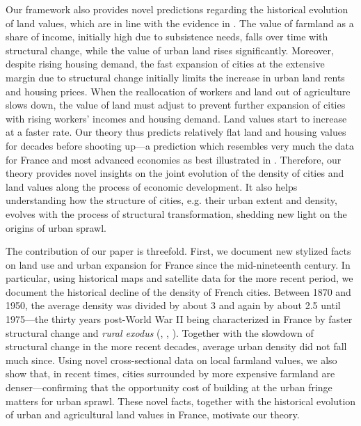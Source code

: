 \documentclass[./20250130-paper.tex]{subfiles}
\begin{document}
	Our framework also provides novel predictions regarding the historical evolution of land values, which are in line with the evidence in \cite{piketty2014capital}. The value of farmland as a share of income, initially high due to subsistence needs, falls over time with structural change, while the value of urban land rises significantly. Moreover, despite rising housing demand, the fast expansion of cities at the extensive margin due to structural change initially limits the increase in urban land rents and housing prices. When the reallocation of workers and land out of agriculture slows down, the value of land must adjust to prevent further expansion of cities with rising workers' incomes and housing demand. Land values start to increase at a faster rate. Our theory thus predicts relatively flat land and housing values for decades before shooting up---a prediction which resembles very much the data for France and most advanced economies as best illustrated in \cite{knoll2017no}. Therefore, our theory provides novel insights on the joint evolution of the density of cities and land values along the process of economic development. It also helps understanding how the structure of cities, e.g. their urban extent and density, evolves with the process of structural transformation, shedding new light on the origins of urban sprawl.%
	
	The contribution of our paper is threefold. First, we document new stylized facts on land use and urban expansion for France since the mid-nineteenth century. In particular, using historical maps and satellite data for the more recent period, we document the historical decline of the density of French cities. Between 1870 and 1950, the average density was divided by about 3 and again by about 2.5 until 1975---the thirty years post-World War II being characterized in France by faster structural change  and \textit{rural exodus} (\cite{mendras1970}, \cite{bairoch1989}, \cite{toutain1993production}). Together with the slowdown of structural change in the more recent decades, average urban density did not fall much since. Using novel cross-sectional data on local farmland values, we also show that, in recent times, cities surrounded by more expensive farmland are denser---confirming that the opportunity cost of building at the urban fringe matters for urban sprawl. These novel facts, together with the historical evolution of urban and agricultural land values in France, motivate our theory. 
	
\end{document}
